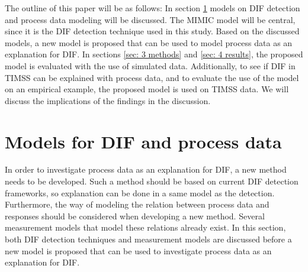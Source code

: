 \documentclass{interact}
\begin{document}
The outline of this paper will be as follows:
In section \ref{sec: 2 models} models on DIF detection and process data modeling will be discussed. The MIMIC model will be central, since it is the DIF detection technique used in this study. Based on the discussed models, a new model is proposed that can be used to model process data as an explanation for DIF. In sections \ref{sec: 3 methods} and \ref{sec: 4 results}, the proposed model is evaluated with the use of simulated data. Additionally, to see if DIF in TIMSS can be explained with process data, and to evaluate the use of the model on an empirical example, the proposed model is used on TIMSS data. We will discuss the implications of the findings in the discussion.

\section{Models for DIF and process data}
\label{sec: 2 models}
In order to investigate process data as an explanation for DIF, a new method needs to be developed. Such a method should be based on current DIF detection frameworks, so explanation can be done in a same model as the detection. Furthermore, the way of modeling the relation between process data and responses should be considered when developing a new method. Several measurement models that model these relations already exist. In this section, both DIF detection techniques and measurement models are discussed before a new model is proposed that can be used to investigate process data as an explanation for DIF.
\end{document}
